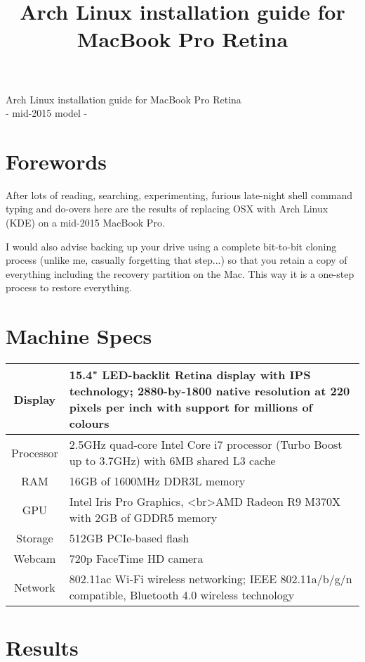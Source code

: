 
\title{Arch Linux installation guide for MacBook Pro Retina}
\color{dark}
\setlength{\parindent}{0em}
\setlength{\parskip}{0.5em}
\renewcommand{\baselinestretch}{1.2}


\sloppy
\centering
\LARGE
Arch Linux installation guide for MacBook Pro Retina\\
 - mid-2015 model - 
\normalsize\justify
\tableofcontents
\clearpage

\section{Forewords}

After lots of reading, searching, experimenting, furious late-night shell command typing and 
do-overs here are the results of replacing OSX with Arch Linux (KDE) on a mid-2015 MacBook Pro. 

I would also advise backing up your drive using a complete bit-to-bit cloning process (unlike me, casually forgetting that step...) so that you retain a copy of everything including the recovery partition on the Mac. This way it is a one-step process to restore everything.

\section{Machine Specs}

\begin{tabularx}{\textwidth}{|c|X|}
	\hline
	Display   & 15.4" LED-backlit Retina display with IPS technology; 2880-by-1800 native resolution at 220 pixels per inch with support for millions of colours \\\hline
	Processor & 2.5GHz quad-core Intel Core i7 processor (Turbo Boost up to 3.7GHz) with 6MB shared L3 cache \\\hline
	RAM       & 16GB of 1600MHz DDR3L memory \\\hline
	GPU       & Intel Iris Pro Graphics, <br>AMD Radeon R9 M370X with 2GB of GDDR5 memory \\\hline
	Storage   & 512GB PCIe-based flash \\\hline
	Webcam    & 720p FaceTime HD camera \\\hline
	Network   & 802.11ac Wi‑Fi wireless networking; IEEE 802.11a/b/g/n compatible, Bluetooth 4.0 wireless technology \\
	\hline
\end{tabularx}

\section{Results}

